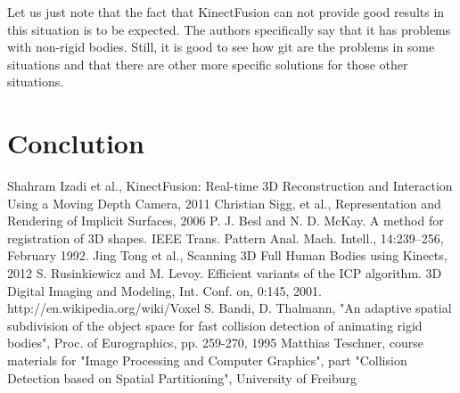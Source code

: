 \documentclass[12pt, a4paper]{article}
\theoremstyle{plain}
\begin{document}
  Let us just note that the fact that KinectFusion can not provide good results
  in this situation is to be expected. The authors specifically say that it has
  problems with non-rigid bodies. Still, it is good to see how git are the
  problems in some situations and that there are other more specific solutions
  for those other situations.

\section{Conclution} %
\label{sec:Conclution}
  



\begin{thebibliography}{widest entry}
   Shahram Izadi et al., KinectFusion: Real-time 3D
    Reconstruction and Interaction Using a Moving Depth Camera, 2011
   Christian Sigg, et
    al., Representation and Rendering of Implicit Surfaces, 2006
   P. J. Besl and N. D. McKay. A method for registration of 3D
    shapes. IEEE Trans. Pattern Anal. Mach. Intell., 14:239–256, February 1992. 
   Jing Tong et al., Scanning 3D Full Human Bodies using
    Kinects, 2012
   S. Rusinkiewicz and M. Levoy. Efficient variants of the
    ICP algorithm. 3D Digital Imaging and Modeling, Int.
    Conf. on, 0:145, 2001.
   http://en.wikipedia.org/wiki/Voxel
   S. Bandi, D. Thalmann, "An adaptive spatial
    subdivision of the object space for fast collision detection of animating
    rigid bodies", Proc. of Eurographics, pp. 259-270, 1995
   Matthias Teschner, course
    materials for "Image Processing and Computer Graphics", part "Collision
    Detection based on Spatial Partitioning", University of Freiburg 
\end{thebibliography}

\end{document}
